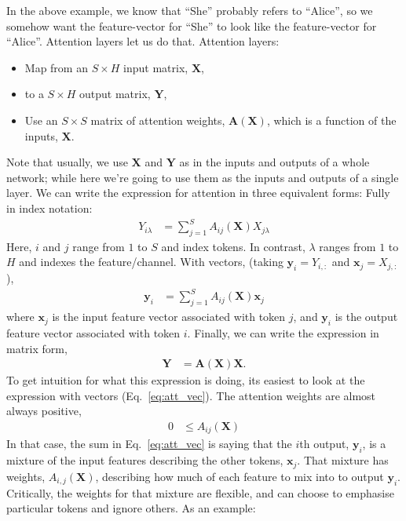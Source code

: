 \documentclass{article}
\newcommand{\x}{\mathbf{x}}
\newcommand{\y}{\mathbf{y}}
\newcommand{\A}{\mathbf{A}}
\newcommand{\X}{\mathbf{X}}
\newcommand{\Y}{\mathbf{Y}}
\begin{document}
In the above example, we know that ``She'' probably refers to ``Alice'', so we somehow want the feature-vector for ``She'' to look like the feature-vector for ``Alice''.
Attention layers let us do that.
Attention layers:
\begin{itemize}
  \item Map from an $S \times H$ input matrix, $\X$,
  \item to a $S \times H$ output matrix, $\Y$,
  \item Use an $S \times S$ matrix of attention weights, $\A(\X)$, which is a function of the inputs, $\X$.
\end{itemize}
Note that usually, we use $\X$ and $\Y$ as in the inputs and outputs of a whole network; while here we're going to use them as the inputs and outputs of a single layer.
We can write the expression for attention in three equivalent forms:
Fully in index notation:
\begin{align}
  \label{eq:att_idx}
  Y_{i \lambda} &= \sum_{j=1}^S A_{ij}(\X) X_{j \lambda}
\end{align}
Here, $i$ and $j$ range from $1$ to $S$ and index tokens.  In contrast, $\lambda$ ranges from $1$ to $H$ and indexes the feature/channel.
With vectors, (taking $\y_i = Y_{i, :}$ and $\x_j = X_{j, :}$),
\begin{align}
  \label{eq:att_vec}
  \y_i &= \sum_{j=1}^S A_{ij}(\X) \x_{j}
\end{align}
where $\x_{j}$ is the input feature vector associated with token $j$, and $\y_i$ is the output feature vector associated with token $i$.
Finally, we can write the expression in matrix form,
\begin{align}
  \label{eq:att_mat}
  \Y &= \A(\X) \X.
\end{align}
To get intuition for what this expression is doing, its easiest to look at the expression with vectors (Eq.~\ref{eq:att_vec}).
The attention weights are almost always positive, 
\begin{align}
  0 &\leq A_{ij}(\X)
\end{align}
In that case, the sum in Eq.~\eqref{eq:att_vec} is saying that the $i$th output, $\y_i$, is a mixture of the input features describing the other tokens, $\x_j$. 
That mixture has weights, $A_{i, j}(\X)$, describing how much of each feature to mix into to output $\y_i$.
Critically, the weights for that mixture are flexible, and can choose to emphasise particular tokens and ignore others.
As an example:
\end{document}
